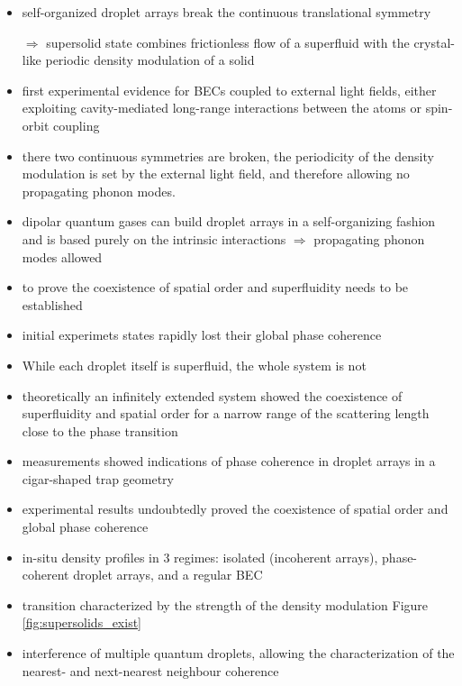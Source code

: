 \begin{itemize}
    \item self-organized droplet arrays break the continuous translational symmetry
    \item[$\Rightarrow$] supersolid state combines frictionless flow of a superfluid with the
        crystal-like periodic density modulation of a solid
    \item first experimental evidence for BECs coupled to external light fields, either exploiting
        cavity-mediated long-range interactions between the atoms or spin-orbit coupling
    \item there two continuous symmetries are broken, the periodicity of the density modulation is set by
        the external light field, and therefore allowing no propagating phonon modes.
    \item dipolar quantum gases can build droplet arrays in a self-organizing fashion
        and is based purely on the intrinsic interactions $\Rightarrow$ propagating phonon modes allowed
    \item to prove the coexistence of spatial order and superfluidity needs to be established
    \item initial experimets states rapidly lost their global phase coherence
    \item While each droplet itself is superfluid, the whole system is not
    \item theoretically an infinitely extended system showed the coexistence of superfluidity
        and spatial order for a narrow range of the scattering length close to the phase transition
    \item measurements showed indications of phase coherence in droplet arrays in a cigar-shaped trap geometry
    \item experimental results undoubtedly proved the coexistence of spatial order and global phase coherence
    \item in-situ density profiles in 3 regimes: isolated (incoherent arrays), phase-coherent droplet arrays,
        and a regular BEC
    \item transition characterized by the strength of the density modulation Figure \ref{fig:supersolids_exist}
    \item interference of multiple quantum droplets, allowing the characterization of the
        nearest- and next-nearest neighbour coherence
\end{itemize}


